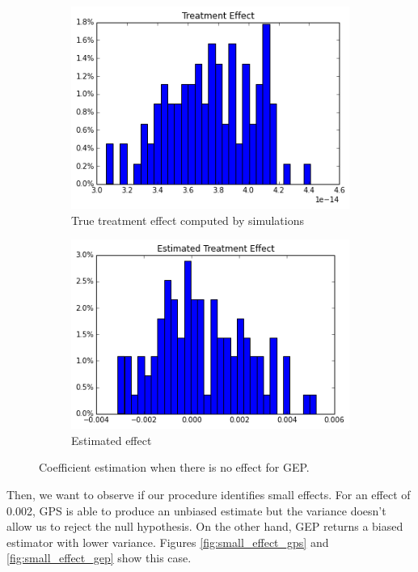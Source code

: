\documentclass[11pt]{article}
\begin{document}
\begin{figure}[h]
\centering
\begin{subfigure}{.5\textwidth}
  \centering
  \includegraphics[width=.9\linewidth]{treatment_effect_no_influence_real.png}
  \caption{True treatment effect computed by simulations}
  \label{fig:sub1}
\end{subfigure}%
\begin{subfigure}{.5\textwidth}
  \centering
  \includegraphics[width=.9\linewidth]{estimated_no_influence_gep.png}
  \caption{Estimated effect}
  \label{fig:sub2}
\end{subfigure}
\caption{Coefficient estimation when there is no effect for GEP.}
\label{fig:no_effect_gep}
\end{figure}
\FloatBarrier

Then, we want to observe if our procedure identifies small effects. For an effect of 0.002, GPS is able to produce an unbiased estimate but the variance doesn't allow us to reject the null hypothesis. On the other hand, GEP returns a biased estimator with lower variance. Figures \ref{fig:small_effect_gps} and \ref{fig:small_effect_gep} show this case. \\
\end{document}
